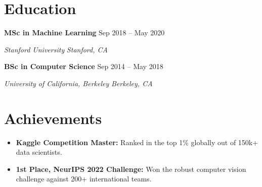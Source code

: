 \documentclass[10pt,a4paper]{article}
\newcommand{\resumeHeading}[4]{
  \vspace{0.2em}\noindent
  \textbf{#1} \hfill #2 \par
  \vspace{-0.1em}\noindent
  \textit{#3} \hfill \textit{#4} \par
}
\begin{document}
\section*{Education}

\resumeHeading{MSc in Machine Learning}{Sep 2018 -- May 2020}{Stanford University}{Stanford, CA}
\vspace{0.4em}
\resumeHeading{BSc in Computer Science}{Sep 2014 -- May 2018}{University of California, Berkeley}{Berkeley, CA}

\section*{Achievements}

\begin{itemize}[leftmargin=0.15in, itemsep=0.1em, parsep=0pt]
    \item \textbf{Kaggle Competition Master:} Ranked in the top 1\% globally out of 150k+ data scientists.
    \item \textbf{1st Place, NeurIPS 2022 Challenge:} Won the robust computer vision challenge against 200+ international teams.
\end{itemize}
\end{document}
